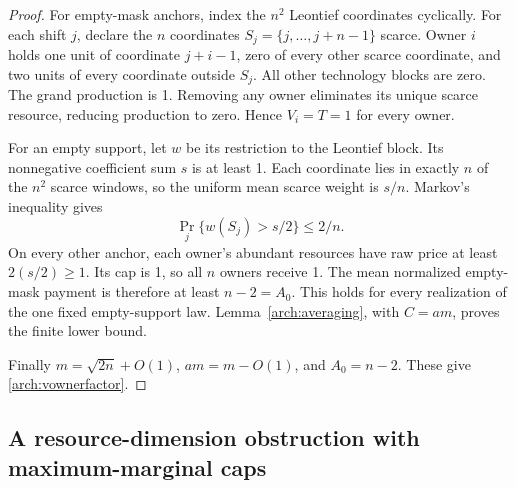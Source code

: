 \documentclass[11pt]{article}
\theoremstyle{definition}\newtheorem{definition}[theorem]{Definition}
\theoremstyle{remark}\newtheorem{remark}[theorem]{Remark}
\begin{document}
\begin{proof}
For empty-mask anchors, index the $n^2$ Leontief coordinates cyclically.
For each shift $j$, declare the $n$ coordinates
$S_j=\{j,\ldots,j+n-1\}$ scarce. Owner $i$ holds one unit of coordinate
$j+i-1$, zero of every other scarce coordinate, and two units of every
coordinate outside $S_j$. All other technology blocks are zero.
The grand production is 1. Removing any owner eliminates its unique scarce
resource, reducing production to zero. Hence $V_i=T=1$ for every owner.

For an empty support, let $w$ be its restriction to the Leontief block.
Its nonnegative coefficient sum $s$ is at least 1. Each coordinate lies in
exactly $n$ of the $n^2$ scarce windows, so the uniform mean scarce weight
is $s/n$. Markov's inequality gives
\[
 \Pr_j\{w(S_j)>s/2\}\le2/n.
\]
On every other anchor, each owner's abundant resources have raw price at
least $2(s/2)\ge1$. Its cap is 1, so all $n$ owners receive 1.
The mean normalized empty-mask payment is therefore at least $n-2=A_0$.
This holds for every realization of the one fixed empty-support law.
Lemma~\ref{arch:averaging}, with $C=am$, proves the finite lower bound.

Finally $m=\sqrt{2n}+O(1)$, $am=m-O(1)$, and $A_0=n-2$.
These give \eqref{arch:vownerfactor}.
\end{proof}

\subsection{A resource-dimension obstruction with maximum-marginal caps}
\end{document}

